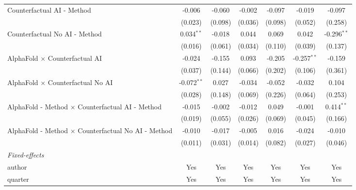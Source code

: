 \begin{tabular}{lcccccc}
   Counterfactual AI - Method                                 & -0.006        & -0.060  & -0.002       & -0.097        & -0.019        & -0.097\\   
                                                              & (0.023)       & (0.098) & (0.036)      & (0.098)       & (0.052)       & (0.258)\\   
   Counterfactual No AI - Method                              & 0.034$^{**}$  & -0.018  & 0.044        & 0.069         & 0.042         & -0.296$^{**}$\\   
                                                              & (0.016)       & (0.061) & (0.034)      & (0.110)       & (0.039)       & (0.137)\\   
   AlphaFold $\times$ Counterfactual AI                       & -0.024        & -0.155  & 0.093        & -0.205        & -0.257$^{**}$ & -0.159\\   
                                                              & (0.037)       & (0.144) & (0.066)      & (0.202)       & (0.106)       & (0.361)\\   
   AlphaFold $\times$ Counterfactual No AI                    & -0.072$^{**}$ & 0.027   & -0.034       & -0.052        & -0.032        & 0.104\\   
                                                              & (0.028)       & (0.148) & (0.069)      & (0.226)       & (0.064)       & (0.253)\\   
   AlphaFold - Method $\times$ Counterfactual AI - Method     & -0.015        & -0.002  & -0.012       & 0.049         & -0.001        & 0.414$^{**}$\\   
                                                              & (0.019)       & (0.055) & (0.026)      & (0.069)       & (0.045)       & (0.166)\\   
   AlphaFold - Method $\times$ Counterfactual No AI - Method  & -0.010        & -0.017  & -0.005       & 0.016         & -0.024        & -0.010\\   
                                                              & (0.011)       & (0.031) & (0.014)      & (0.082)       & (0.027)       & (0.046)\\   
   \midrule
   \emph{Fixed-effects}\\
   author                                                     & Yes           & Yes     & Yes          & Yes           & Yes           & Yes\\  
   quarter                                                    & Yes           & Yes     & Yes          & Yes           & Yes           & Yes\\  

\end{tabular}
